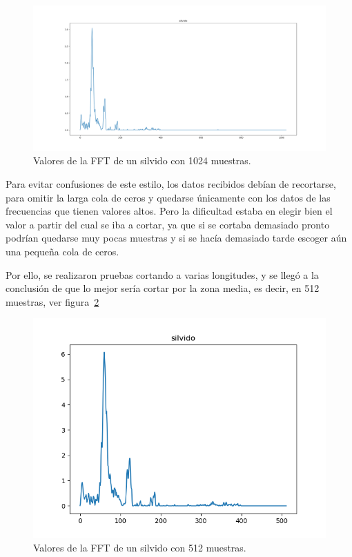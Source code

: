\documentclass[a4paper, 12pt]{book}
\begin{document}
\begin{figure}
	\centering
	\includegraphics[width=12cm, keepaspectratio]{img/silvido1024.png}
	\caption{Valores de la FFT de un silvido con 1024 muestras.}\label{fig:silvido1024}
\end{figure}

Para evitar confusiones de este estilo, los datos recibidos debían de recortarse, para omitir la larga cola de ceros y quedarse únicamente con los datos de las frecuencias que tienen valores altos. Pero la dificultad estaba en elegir bien el valor a partir del cual se iba a cortar, ya que si se cortaba demasiado pronto podrían quedarse muy pocas muestras y si se hacía demasiado tarde escoger aún una pequeña cola de ceros.

Por ello, se realizaron pruebas cortando a varias longitudes, y se llegó a la conclusión de que lo mejor sería cortar por la zona media, es decir, en 512 muestras, ver figura~\ref{fig:silvido512}

\begin{figure}
	\centering
	\includegraphics[width=12cm, keepaspectratio]{img/silvido512.png}
	\caption{Valores de la FFT de un silvido con 512 muestras.}\label{fig:silvido512}
\end{figure}
\end{document}
